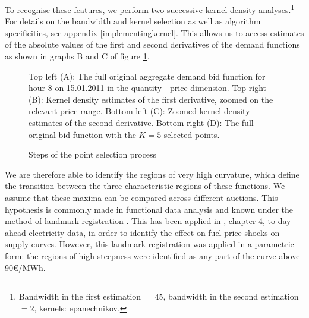 To recognise these features, we perform two successive kernel density analyses.\footnote{Bandwidth in the first estimation $=45$, bandwidth in the second estimation $=2$, kernels: epanechnikov.}
For details on the bandwidth and kernel selection as well as algorithm specificities, see appendix \ref{implementingkernel}. This allows us to access estimates of the absolute values of the first and second derivatives of the demand functions as shown in graphs B and C of figure \ref{selectedpoints}.\\ 
\begin{figure}[!ht]
\begin{center}
\caption{Steps of the point selection process}
\label{selectedpoints}
\end{center}
{\small Top left (A): The full original aggregate demand bid function for hour 8 on 15.01.2011 in the quantity - price dimension. Top right (B): Kernel density estimates of the first derivative, zoomed on the relevant price range. Bottom left (C): Zoomed kernel density estimates of the second derivative. Bottom right (D): The full original bid function with the $K=5$ selected points. 
}
\end{figure}

We are therefore able to identify the regions of very high curvature, which define the transition between the three characteristic regions of these functions. We assume that these maxima can be compared across different auctions. This hypothesis is commonly made in functional data analysis and known under the method of landmark registration \cite{ramsaysilverman2005functional}. This has been applied in \cite{wolfi2013interacting}, chapter 4, to day-ahead electricity data, in order to identify the effect on fuel price shocks on supply curves. However, this landmark registration was applied in a parametric form: the regions of high steepness were identified as any part of the curve above 90€/MWh. \\

